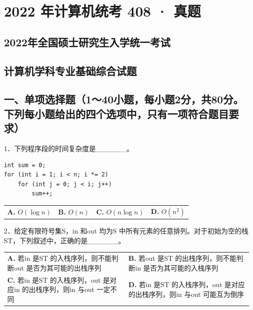 \documentclass[UTF8,11pt]{ctexart}
\begin{document}
\section*{2022 年计算机统考 408 · 真题}
\subsection*{2022年全国硕士研究生入学统一考试}

\subsection*{计算机学科专业基础综合试题}

\subsection*{一、单项选择题（1～40小题，每小题2分，共80分。下列每小题给出的四个选项中，只有一项符合题目要求）}

1．下列程序段的时间复杂度是\_\_\_\_\_\_。


\begin{Verbatim}[breaklines,breakanywhere,fontsize=\small]
int sum = 0;
for (int i = 1; i < n; i *= 2)
    for (int j = 0; j < i; j++)
        sum++;
\end{Verbatim}

\begin{center}\begin{tabular}{>{\raggedright\arraybackslash}p{\dimexpr(\linewidth-8\tabcolsep)/4\relax}>{\raggedright\arraybackslash}p{\dimexpr(\linewidth-8\tabcolsep)/4\relax}>{\raggedright\arraybackslash}p{\dimexpr(\linewidth-8\tabcolsep)/4\relax}>{\raggedright\arraybackslash}p{\dimexpr(\linewidth-8\tabcolsep)/4\relax}}
\textbf{A.} \(\displaystyle O(\log n)\) & \textbf{B.} \(\displaystyle O(n)\) & \textbf{C.} \(\displaystyle O(n\log n)\) & \textbf{D.} \(\displaystyle O(n^2)\)\\[.35em]\end{tabular}\end{center}

2．给定有限符号集S，in 和out 均为S 中所有元素的任意排列。对于初始为空的栈ST，下列叙述中，正确的是\_\_\_\_\_\_。


\begin{center}\begin{tabular}{>{\raggedright\arraybackslash}p{\dimexpr(\linewidth-4\tabcolsep)/2\relax}>{\raggedright\arraybackslash}p{\dimexpr(\linewidth-4\tabcolsep)/2\relax}}
\textbf{A.} 若in 是ST 的入栈序列，则不能判断out 是否为其可能的出栈序列 & \textbf{B.} 若out 是ST 的出栈序列，则不能判断in 是否为其可能的入栈序列\\[.35em]
\textbf{C.} 若in 是ST 的入栈序列，out 是对应in 的出栈序列，则in 与out 一定不同 & \textbf{D.} 若in 是ST 的入栈序列，out 是对应的出栈序列，则in 与out 可能互为倒序\\[.35em]\end{tabular}\end{center}
\end{document}
